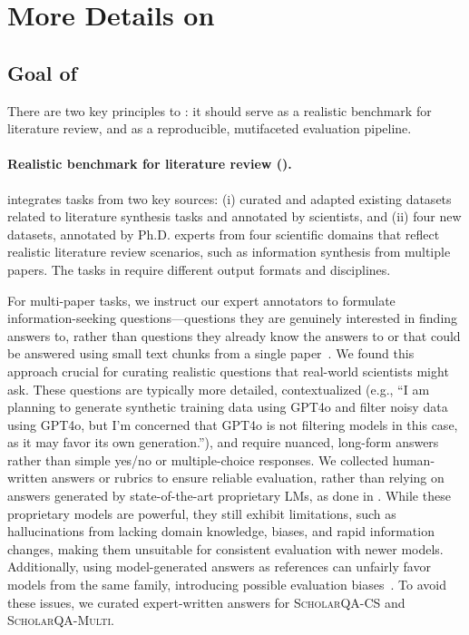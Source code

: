\section{More Details on \data}

\subsection{Goal of \data}
There are two key principles to \data: it should serve as a realistic benchmark for literature review, and as a reproducible, mutifaceted evaluation pipeline. 

\paragraph{Realistic benchmark for literature review ().} 
\data integrates tasks from two key sources: (i) curated and adapted existing datasets related to literature synthesis tasks and annotated by scientists, and (ii) four new datasets, annotated by Ph.D. experts from four scientific domains that reflect realistic literature review scenarios, such as information synthesis from multiple papers. 
The tasks in \data require different output formats and disciplines. 

For multi-paper tasks, we instruct our expert annotators to formulate information-seeking questions—questions they are genuinely interested in finding answers to, rather than questions they already know the answers to or that could be answered using small text chunks from a single paper~\citep{asai-choi-2021-challenges, choi-etal-2018-quac}. 
We found this approach crucial for curating realistic questions that real-world scientists might ask. These questions are typically more detailed, contextualized (e.g., ``I am planning to generate synthetic training data using GPT4o and filter noisy data using GPT4o, but I'm concerned that GPT4o is not filtering models in this case, as it may favor its own generation.''), and require nuanced, long-form answers rather than simple yes/no or multiple-choice responses. 
We collected human-written answers or rubrics to ensure reliable evaluation, rather than relying on answers generated by state-of-the-art proprietary LMs, as done in \citet{xu-etal-2024-kiwi, malaviya2023expertqa}. While these proprietary models are powerful, they still exhibit limitations, such as hallucinations from lacking domain knowledge, biases, and rapid information changes, making them unsuitable for consistent evaluation with newer models. Additionally, using model-generated answers as references can unfairly favor models from the same family, introducing possible evaluation biases~\cite{panickssery2024llm}. To avoid these issues, we curated expert-written answers for \textsc{ScholarQA-CS} and \textsc{ScholarQA-Multi}.   


